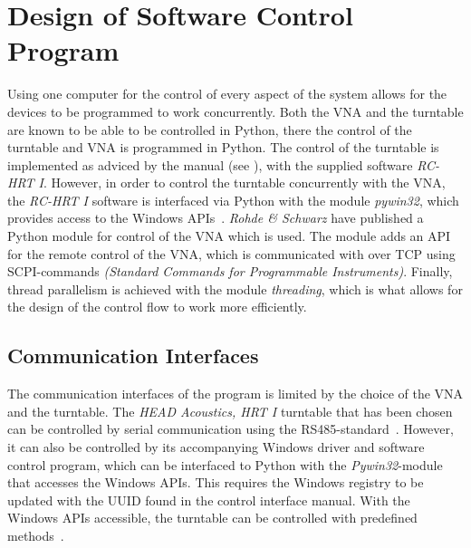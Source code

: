 \section{Design of Software Control Program}
Using one computer for the control of every aspect of the system allows for the devices to be programmed to work concurrently. Both the VNA and the turntable are known to be able to be controlled in Python, there the control of the turntable and VNA is programmed in Python. The control of the turntable is implemented as adviced by the manual (see \cite{hrt_i_manual}), with the supplied software \textit{RC-HRT I}. However, in order to control the turntable concurrently with the VNA, the \textit{RC-HRT I} software is interfaced via Python with the module \textit{pywin32}, which provides access to the Windows APIs~\cite{pywin32}. \textit{Rohde \& Schwarz} have published a Python module for control of the VNA which is used. The module adds an API for the remote control of the VNA, which is communicated with over TCP using SCPI-commands \textit{(Standard Commands for Programmable Instruments)}. Finally, thread parallelism is achieved with the module \textit{threading}, which is what allows for the design of the control flow to work more efficiently.

\subsection{Communication Interfaces}
The communication interfaces of the program is limited by the choice of the VNA and the turntable. The \textit{HEAD Acoustics, HRT I} turntable that has been chosen can be controlled by serial communication using the RS485-standard~\cite{hrt_i_data_sheet}. However, it can also be controlled by its accompanying Windows driver and software control program, which can be interfaced to Python with the \textit{Pywin32}-module that accesses the Windows APIs. This requires the Windows registry to be updated with the UUID found in the control interface manual. With the Windows APIs accessible, the turntable can be controlled with predefined methods~\cite{hrt_control_api_manual}. 

